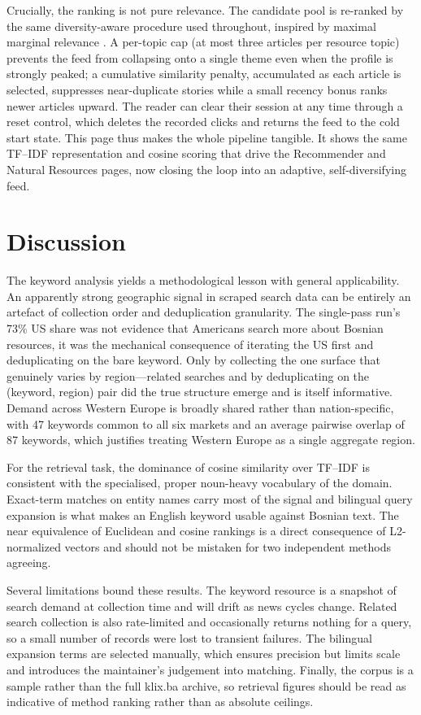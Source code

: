 \documentclass[fleqn,10pt]{wlscirep}
\begin{document}
Crucially, the ranking is not pure relevance. The candidate pool is re-ranked by the same diversity-aware procedure used throughout, inspired by maximal marginal relevance \cite{carbonell1998use}. A per-topic cap (at most three articles per resource topic) prevents the feed from collapsing onto a single theme even when the profile is strongly peaked; a cumulative similarity penalty, accumulated as each article is selected, suppresses near-duplicate stories while a small recency bonus ranks newer articles upward. The reader can clear their session at any time through a reset control, which deletes the recorded clicks and returns the feed to the cold start state. This page thus makes the whole pipeline tangible. It shows the same TF--IDF representation and cosine scoring that drive the Recommender and Natural Resources pages, now closing the loop into an adaptive, self-diversifying feed.
\section*{Discussion}

The keyword analysis yields a methodological lesson with general applicability. An apparently strong geographic signal in scraped search data can be entirely an artefact of collection order and deduplication granularity. The single-pass run's 73\% US share was not evidence that Americans search more about Bosnian resources, it was the mechanical consequence of iterating the US first and deduplicating on the bare keyword. Only by collecting the one surface that genuinely varies by region—related searches and by deduplicating on the (keyword, region) pair did the true structure emerge and is itself informative. Demand across Western Europe is broadly shared rather than nation-specific, with 47 keywords common to all six markets and an average pairwise overlap of 87 keywords, which justifies treating Western Europe as a single aggregate region.

For the retrieval task, the dominance of cosine similarity over TF--IDF is consistent with the specialised, proper noun-heavy vocabulary of the domain. Exact-term matches on entity names carry most of the signal and bilingual query expansion is what makes an English keyword usable against Bosnian text. The near equivalence of Euclidean and cosine rankings is a direct consequence of L2-normalized vectors and should not be mistaken for two independent methods agreeing.

Several limitations bound these results. The keyword resource is a snapshot of search demand at collection time and will drift as news cycles change. Related search collection is also rate-limited and occasionally returns nothing for a query, so a small number of records were lost to transient failures. The bilingual expansion terms are selected manually, which ensures precision but limits scale and introduces the maintainer's judgement into matching. Finally, the corpus is a sample rather than the full klix.ba archive, so retrieval figures should be read as indicative of method ranking rather than as absolute ceilings.
\end{document}
